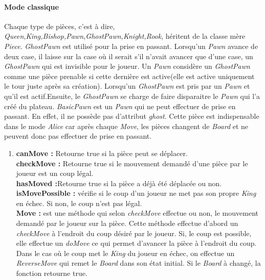 \documentclass[10pt, a4paper]{article}
\begin{document}
\paragraph{Mode classique}Chaque type de pièces, c'est à dire, \textit{Queen,King,Bishop,Pawn,GhostPawn,Knight,Rook}, héritent de la classe mère \textit{Piece}.
\textit{GhostPawn} est utilisé pour la prise en passant. Lorsqu'un \textit{Pawn} avance de deux case, il laisse sur la case où il serait s'il n'avait avancer que d'une case, un \textit{GhostPawn} qui est invisible pour le joueur. Un \textit{Pawn} considère un \textit{GhostPawn} comme une pièce prenable si cette dernière est active(elle est active uniquement le tour juste après sa création). Lorsqu'un \textit{GhostPawn} est pris par un \textit{Pawn} et qu'il est actif.Ensuite, le \textit{GhostPawn} se charge de faire disparaitre le \textit{Pawn} qui l'a créé du plateau.
\textit{BasicPawn} est un \textit{Pawn} qui ne peut effectuer de prise en passant. En effet, il ne possède pas d'attribut \textit{ghost}. Cette pièce est indispensable dans le mode \textit{Alice} car après chaque \textit{Move}, les pièces changent de \textit{Board} et ne peuvent donc pas effectuer de prise en passant.
\begin{enumerate}
\item{}
\textbf{canMove :} Retourne true si la pièce peut se déplacer. \\
\textbf{checkMove :} Retourne true si le mouvement demandé d'une pièce par le joueur est un coup légal.\\
\textbf{hasMoved :}Retourne true si la pièce a déjà été déplacée ou non.\\
\textbf{isMovePossible :} vérifie si le coup d'un joueur ne met pas son propre \textit{King} en échec. Si non, le coup n'est pas légal.\\
\textbf{Move :} est une méthode qui selon \textit{checkMove} effectue ou non, le mouvement demandé par le joueur sur la pièce. Cette méthode effectue d'abord un \textit{checkMove} à l'endroit du coup désiré par le joueur. Si, le coup est possible, elle effectue un \textit{doMove} ce qui permet d'avancer la pièce à l'endroit du coup. Dans le cas où le coup met le \textit{King} du joueur en échec, on effectue un \textit{ReverseMove} qui remet le \textit{Board} dans son état initial. Si le \textit{Board} à changé, la fonction retourne true.\\
\end{enumerate}
\end{document}
